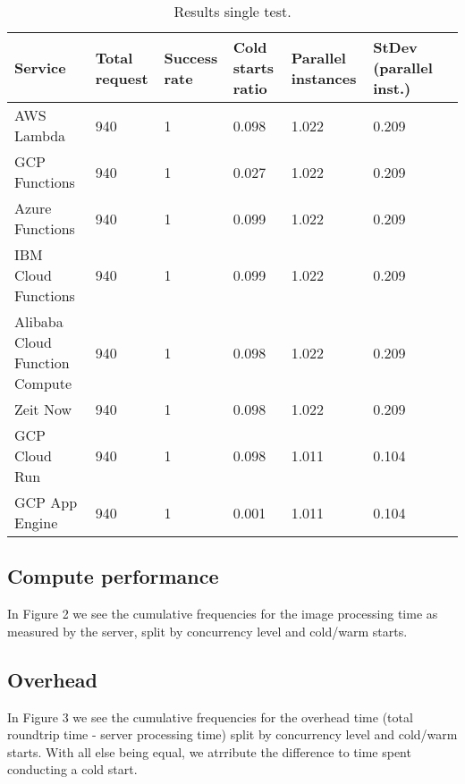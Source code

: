 \documentclass[11pt]{article}
\begin{document}
\begin{table}
\centering
 \begin{tabularx}{1\textwidth}{p{4cm} X X X X X X}
 \textbf{Service} & \textbf{Total request} & \textbf{Success rate} & \textbf{Cold starts ratio} & \textbf{Parallel instances} & \textbf{StDev (parallel inst.)} \\
 \hline
 \hline
 AWS Lambda & 940 & 1 & 0.098 & 1.022 & 0.209\\
 \hline
 GCP Functions & 940 & 1 & 0.027 & 1.022 & 0.209\\
 \hline
 Azure Functions & 940 & 1 & 0.099 & 1.022 & 0.209\\
 \hline
 IBM Cloud Functions & 940 & 1 & 0.099 & 1.022 & 0.209\\
 \hline
 Alibaba Cloud Function Compute & 940 & 1 & 0.098 & 1.022 & 0.209\\
 \hline
 Zeit Now & 940 & 1 & 0.098 & 1.022 & 0.209\\
 \hline
 GCP Cloud Run & 940 & 1 & 0.098 & 1.011 & 0.104\\
 \hline
 GCP App Engine & 940 & 1 & 0.001 & 1.011 & 0.104\\
 \hline

\end{tabularx}
\caption{Results single test.}
\label{Tab:single}
\end{table}

\subsection{Compute performance}
In Figure 2 %
we see the cumulative frequencies for the image processing time
as measured by the server, split by concurrency level and cold/warm starts.



\subsection{Overhead}

In Figure 3 %
we see the cumulative frequencies for the overhead time
(total roundtrip time - server processing time) %
split by concurrency level and cold/warm starts.
With all else being equal,
we atrribute the difference to time spent conducting a cold start.

\end{document}
